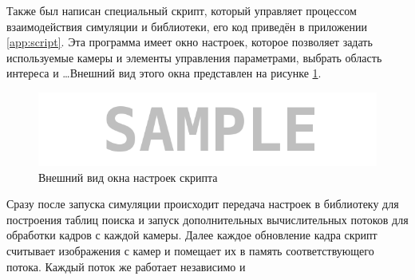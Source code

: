 Также был написан специальный скрипт, который управляет процессом взаимодействия симуляции и библиотеки, 
его код приведён в приложении \ref{app:script}. Эта программа имеет окно настроек, которое позволяет задать
используемые камеры и элементы управления параметрами, выбрать область интереса и \dots Внешний вид этого 
окна представлен на рисунке \ref{pic:connec_inter}.
\begin{figure}[H]
    \begin{center}
        \includegraphics[scale=0.5]{pics/sample.png}                                                                                            %
        \caption{Внешний вид окна настроек скрипта}
        \label{pic:connec_inter}
    \end{center}
\end{figure}
Сразу после запуска симуляции происходит передача настроек в библиотеку для построения таблиц поиска   
и запуск дополнительных вычислительных потоков для обработки кадров с каждой камеры. Далее каждое обновление
кадра скрипт считывает изображения с камер и помещает их в память соответствующего потока. Каждый поток же
работает независимо и  %